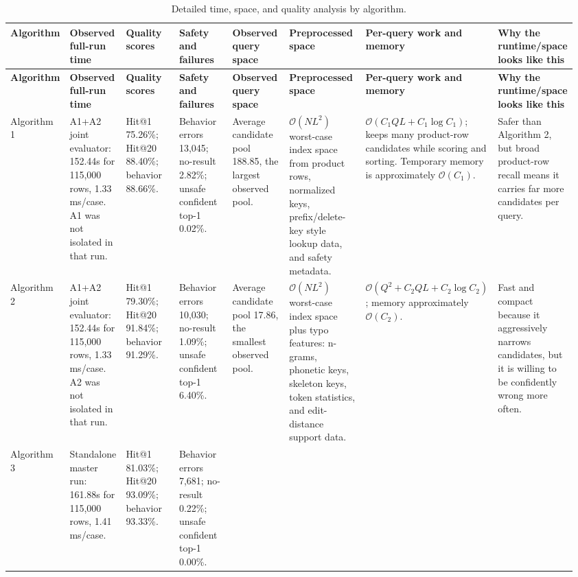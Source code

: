 \documentclass[11pt]{article}
\newcommand{\bigO}{\mathcal{O}}
\begin{document}
\begin{landscape}
\tiny
\setlength{\tabcolsep}{1pt}
\begin{longtable}{@{}L{0.07\linewidth}L{0.10\linewidth}L{0.13\linewidth}L{0.12\linewidth}L{0.11\linewidth}L{0.15\linewidth}L{0.15\linewidth}L{0.13\linewidth}@{}}
\caption{Detailed time, space, and quality analysis by algorithm.}\\
\toprule
\textbf{Algorithm} & \textbf{Observed full-run time} & \textbf{Quality scores} &
\textbf{Safety and failures} & \textbf{Observed query space} &
\textbf{Preprocessed space} & \textbf{Per-query work and memory} &
\textbf{Why the runtime/space looks like this} \\
\midrule
\endfirsthead
\toprule
\textbf{Algorithm} & \textbf{Observed full-run time} & \textbf{Quality scores} &
\textbf{Safety and failures} & \textbf{Observed query space} &
\textbf{Preprocessed space} & \textbf{Per-query work and memory} &
\textbf{Why the runtime/space looks like this} \\
\midrule
\endhead
Algorithm 1 &
A1+A2 joint evaluator: 152.44s for 115,000 rows, 1.33 ms/case. A1 was not isolated in that run. &
Hit@1 75.26\%; Hit@20 88.40\%; behavior 88.66\%. &
Behavior errors 13,045; no-result 2.82\%; unsafe confident top-1 0.02\%. &
Average candidate pool 188.85, the largest observed pool. &
\(\bigO(NL^2)\) worst-case index space from product rows, normalized keys, prefix/delete-key style lookup data, and safety metadata. &
\(\bigO(C_1QL + C_1\log C_1)\); keeps many product-row candidates while scoring and sorting. Temporary memory is approximately \(\bigO(C_1)\). &
Safer than Algorithm 2, but broad product-row recall means it carries far more candidates per query. \\
Algorithm 2 &
A1+A2 joint evaluator: 152.44s for 115,000 rows, 1.33 ms/case. A2 was not isolated in that run. &
Hit@1 79.30\%; Hit@20 91.84\%; behavior 91.29\%. &
Behavior errors 10,030; no-result 1.09\%; unsafe confident top-1 6.40\%. &
Average candidate pool 17.86, the smallest observed pool. &
\(\bigO(NL^2)\) worst-case index space plus typo features: n-grams, phonetic keys, skeleton keys, token statistics, and edit-distance support data. &
\(\bigO(Q^2 + C_2QL + C_2\log C_2)\); memory approximately \(\bigO(C_2)\). &
Fast and compact because it aggressively narrows candidates, but it is willing to be confidently wrong more often. \\
Algorithm 3 &
Standalone master run: 161.88s for 115,000 rows, 1.41 ms/case. &
Hit@1 81.03\%; Hit@20 93.09\%; behavior 93.33\%. &
Behavior errors 7,681; no-result 0.22\%; unsafe confident top-1 0.00\%. &

\end{longtable}
\end{landscape}
\end{document}
